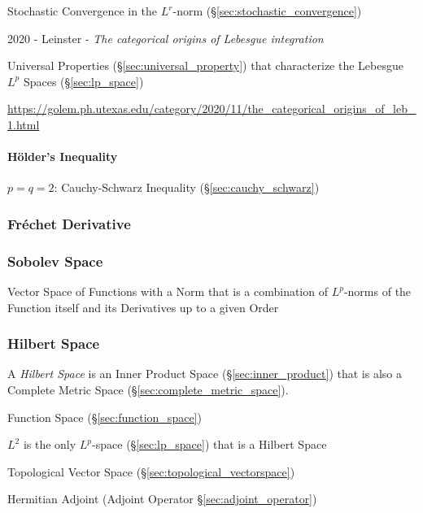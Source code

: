 \fist Stochastic Convergence in the $L^r$-norm
(\S\ref{sec:stochastic_convergence})

\asterism

2020 - Leinster - \emph{The categorical origins of Lebesgue integration}

Universal Properties (\S\ref{sec:universal_property}) that characterize the
Lebesgue $L^p$ Spaces (\S\ref{sec:lp_space})

\url{https://golem.ph.utexas.edu/category/2020/11/the_categorical_origins_of_leb_1.html}



\paragraph{H\"older's Inequality}\label{sec:holders_inequality}\hfill

$p = q = 2$: Cauchy-Schwarz Inequality (\S\ref{sec:cauchy_schwarz})



\subsubsection{Fr\'echet Derivative}\label{sec:frechet_derivative}

\subsubsection{Sobolev Space}\label{sec:sobolev_space}

Vector Space of Functions with a Norm that is a combination of $L^p$-norms of
the Function itself and its Derivatives up to a given Order



\subsubsection{Hilbert Space}\label{sec:hilbert_space}

A \emph{Hilbert Space} is an Inner Product Space (\S\ref{sec:inner_product})
that is also a Complete Metric Space (\S\ref{sec:complete_metric_space}).

Function Space (\S\ref{sec:function_space})

$L^2$ is the only $L^p$-space (\S\ref{sec:lp_space}) that is a Hilbert Space

Topological Vector Space (\S\ref{sec:topological_vectorspace})

Hermitian Adjoint (Adjoint Operator \S\ref{sec:adjoint_operator})

